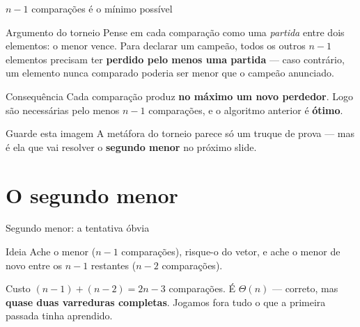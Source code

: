 \documentclass[aspectratio=169]{beamer}
\begin{document}
\begin{frame}[shrink=20]{$n-1$ comparações é o mínimo possível}
  \begin{block}{Argumento do torneio}
    Pense em cada comparação como uma \emph{partida} entre dois elementos: o
    menor vence. Para declarar um campeão, todos os outros $n-1$ elementos
    precisam ter \textbf{perdido pelo menos uma partida} --- caso contrário, um
    elemento nunca comparado poderia ser menor que o campeão anunciado.
  \end{block}

  \begin{block}{Consequência}
    Cada comparação produz \textbf{no máximo um novo perdedor}. Logo são
    necessárias pelo menos $n-1$ comparações, e o algoritmo anterior é
    \textbf{ótimo}.
  \end{block}

  \begin{exampleblock}{Guarde esta imagem}
    A metáfora do torneio parece só um truque de prova --- mas é ela que vai
    resolver o \textbf{segundo menor} no próximo slide.
  \end{exampleblock}
\end{frame}

\section{O segundo menor}

\begin{frame}{Segundo menor: a tentativa óbvia}
  \begin{block}{Ideia}
    Ache o menor ($n-1$ comparações), risque-o do vetor, e ache o menor de
    novo entre os $n-1$ restantes ($n-2$ comparações).
  \end{block}

  \begin{center}
  \end{center}

  \begin{block}{Custo}
    $(n-1) + (n-2) = 2n - 3$ comparações. É $\Theta(n)$ --- correto, mas
    \textbf{quase duas varreduras completas}. Jogamos fora tudo o que a
    primeira passada tinha aprendido.
  \end{block}
\end{frame}
\end{document}
